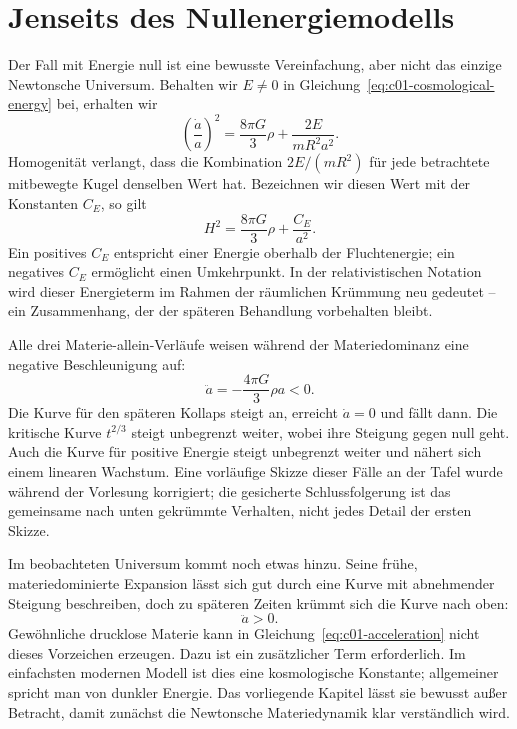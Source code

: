 \section{Jenseits des Nullenergiemodells}

Der Fall mit Energie null ist eine bewusste Vereinfachung, aber nicht das einzige Newtonsche Universum. Behalten wir \(E\neq0\) in Gleichung~\eqref{eq:c01-cosmological-energy} bei, erhalten wir
\begin{equation}
\left(\frac{\dot a}{a}\right)^2
=\frac{8\pi G}{3}\rho+\frac{2E}{mR^2a^2}.
\label{eq:c01-nonzero-energy}
\end{equation}
Homogenität verlangt, dass die Kombination \(2E/(mR^2)\) für jede betrachtete mitbewegte Kugel denselben Wert hat. Bezeichnen wir diesen Wert mit der Konstanten \(C_E\), so gilt
\begin{equation}
H^2=\frac{8\pi G}{3}\rho+\frac{C_E}{a^2}.
\end{equation}
Ein positives \(C_E\) entspricht einer Energie oberhalb der Fluchtenergie; ein negatives \(C_E\) ermöglicht einen Umkehrpunkt. In der relativistischen Notation wird dieser Energieterm im Rahmen der räumlichen Krümmung neu gedeutet – ein Zusammenhang, der der späteren Behandlung vorbehalten bleibt.

Alle drei Materie-allein-Verläufe weisen während der Materiedominanz eine negative Beschleunigung auf:
\begin{equation}
\ddot a=-\frac{4\pi G}{3}\rho a<0.
\end{equation}
Die Kurve für den späteren Kollaps steigt an, erreicht \(\dot a=0\) und fällt dann. Die kritische Kurve \(t^{2/3}\) steigt unbegrenzt weiter, wobei ihre Steigung gegen null geht. Auch die Kurve für positive Energie steigt unbegrenzt weiter und nähert sich einem linearen Wachstum. Eine vorläufige Skizze dieser Fälle an der Tafel wurde während der Vorlesung korrigiert; die gesicherte Schlussfolgerung ist das gemeinsame nach unten gekrümmte Verhalten, nicht jedes Detail der ersten Skizze.

Im beobachteten Universum kommt noch etwas hinzu. Seine frühe, materiedominierte Expansion lässt sich gut durch eine Kurve mit abnehmender Steigung beschreiben, doch zu späteren Zeiten krümmt sich die Kurve nach oben:
\begin{equation}
\ddot a>0.
\end{equation}
Gewöhnliche drucklose Materie kann in Gleichung~\eqref{eq:c01-acceleration} nicht dieses Vorzeichen erzeugen. Dazu ist ein zusätzlicher Term erforderlich. Im einfachsten modernen Modell ist dies eine kosmologische Konstante; allgemeiner spricht man von dunkler Energie. Das vorliegende Kapitel lässt sie bewusst außer Betracht, damit zunächst die Newtonsche Materiedynamik klar verständlich wird.

